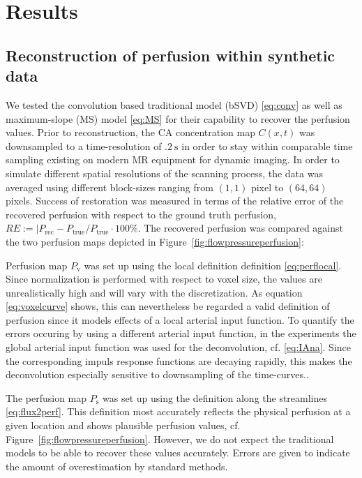 \documentclass[journal,twocolumn]{IEEEtran}
\newcommand{\Perf}{P}
\newcommand{\Perfv}{P_{\mathrm{v}}}
\newcommand{\Perfs}{P_{\mathrm{s}}}
\begin{document}
	\section{Results}	
	\subsection{Reconstruction of perfusion within synthetic data}\label{sec:RecPhantom}


	We tested the convolution based traditional model (bSVD) \eqref{eq:conv} as well as maximum-slope (MS) model \eqref{eq:MS} for their capability to recover the perfusion values.
	Prior to reconstruction, the CA concentration map $C(x,t)$ was downsampled to a time-resolution of $\SI{.2}{\second}$ in order to stay within comparable time sampling existing on modern MR equipment for dynamic imaging.
	In order to simulate different spatial resolutions of the scanning process, the data was averaged using different block-sizes ranging from $(1,1)$ pixel to $(64,64)$ pixels.		
	Success of restoration was measured in terms of the relative error of the recovered perfusion with respect to the ground truth perfusion, $RE := \vert \Perf_{\mathrm{rec}} - \Perf_{\mathrm{true}}/\Perf_{\mathrm{true}}\cdot 100\%$.
	The recovered perfusion was compared against the two perfusion maps depicted in Figure~\ref{fig:flowpressureperfusion}:
	
	Perfusion map $\Perfv$ was set up using the local definition definition \eqref{eq:perflocal}. 
	Since normalization is performed with respect to voxel size, the values are unrealistically high and will vary with the discretization.
	As equation \eqref{eq:voxelcurve} shows, this can nevertheless be regarded a valid definition of perfusion since it models effects of a local arterial input function.
	To quantify the errors occuring by using a different arterial input function, in the experiments the global arterial input function was used for the deconvolution, cf. \eqref{eq:IAna}.
	Since the corresponding impuls response functions are decaying rapidly, this makes the deconvolution especially sensitive to downsampling of the time-curves..

	The perfusion map $\Perfs$ was set up using the definition along the streamlines \eqref{eq:flux2perf}.
	This definition most accurately reflects the physical perfusion at a given location and shows plausible perfusion values, cf. Figure~\ref{fig:flowpressureperfusion}.
	However, we do not expect the traditional models to be able to recover these values accurately.
	Errors are given to indicate the amount of overestimation by standard methods.
	
\end{document}
